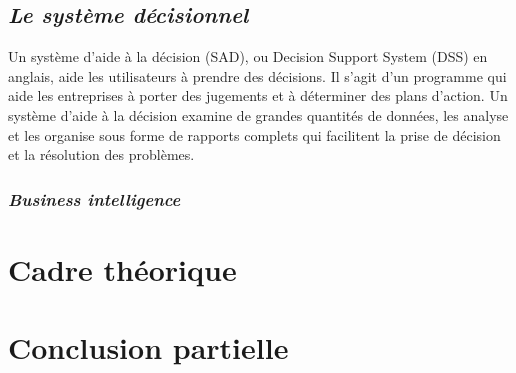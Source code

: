         \subsection[Le système décisionnel]{\textit{Le système décisionnel}}
        Un système d’aide à la décision (SAD), ou Decision Support System (DSS)
        en anglais, aide les utilisateurs à prendre des décisions.
        Il s’agit d’un programme qui aide les entreprises à porter des jugements
        et à déterminer des plans d’action.
        Un système d’aide à la décision examine
        de grandes quantités de données, les analyse et les organise sous forme
        de rapports complets qui facilitent la prise de décision et
        la résolution des problèmes. \cite*{SAD}
            \subsubsection[Business intelligence]{\textit{Business intelligence}}
    \section[Cadre théorique]{Cadre théorique}
    \section[Conclusion partielle]{Conclusion partielle}